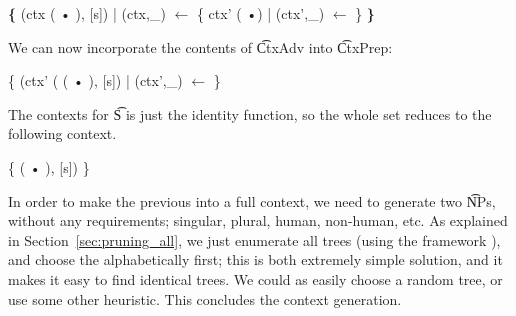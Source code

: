 \begin{EmptyItem}
\begin{HighlightingFancy}[]
 \OtherTok{::=} \textbf{\{} (ctx ( • ), [s])
            | (ctx,\_) $\leftarrow$ \{ ctx' (  •)
                         | (ctx',\_) $\leftarrow$  \} 
            \textbf{\}}
\end{HighlightingFancy}
\end{EmptyItem}

\noindent We can now incorporate the contents of \t{CtxAdv} into
\t{CtxPrep}:


\begin{EmptyItem}
\begin{HighlightingFancy}[]
 \OtherTok{::=} \{ (ctx' (  ( • ), [s])
            | (ctx',\_) $\leftarrow$  \} 
\end{HighlightingFancy}
\end{EmptyItem}

\noindent The contexts for \t{S} is just the identity function, so the
whole set reduces to the following context.

\begin{EmptyItem}
\begin{HighlightingFancy}[]
 \OtherTok{::=} \{   ( • ), [s]) \} 
\end{HighlightingFancy}
\end{EmptyItem}

\noindent In order to make the previous into a full context, we need to
generate two \t{NP}s, without any requirements; singular, plural,
human, non-human, etc. As explained in Section~\ref{sec:pruning_all},
we just enumerate all trees (using the \feat{} framework \cite{feat}),
and choose the alphabetically first; this is both extremely simple
solution, and it makes it easy to find identical trees. We could as
easily choose a random tree, or use some other heuristic.
This concludes the context generation.


